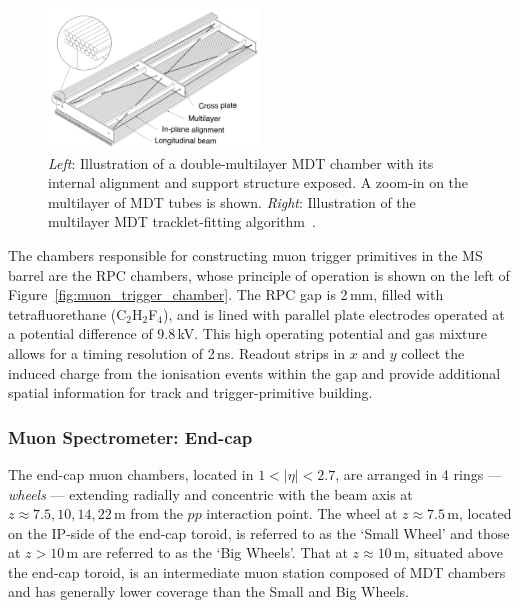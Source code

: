 \begin{figure}[!htb]
    \begin{center}
        \includegraphics[width=0.5\textwidth]{figures/chapter2/muon_spec/mdt_chamber}
        \caption{
            \textit{Left}: Illustration of a double-multilayer MDT chamber with its internal alignment
                and support structure exposed. A zoom-in on the multilayer of MDT tubes is shown.
            \textit{Right}: Illustration of the multilayer MDT tracklet-fitting algorithm~\cite{MDTtrackfit}.
        }
        \label{fig:mdt_chamber}
    \end{center}
\end{figure}

The chambers responsible for constructing muon trigger primitives in the MS barrel
are the RPC chambers, whose principle of operation is shown on the left of Figure~\ref{fig:muon_trigger_chamber}. 
The RPC gap is 2\,mm, filled with tetrafluorethane (C$_2$H$_2$F$_4$), and is lined with
parallel plate electrodes operated at a potential difference of 9.8\,kV. This high operating
potential and gas mixture allows for a timing resolution of 2\,ns. Readout strips in $x$ and $y$
collect the induced charge from the ionisation events within the gap and provide
additional spatial information for track and trigger-primitive building.

\subsubsection{Muon Spectrometer: End-cap}
\label{sec:ms_endcap}

The end-cap muon chambers, located in $1 < \lvert \eta \rvert < 2.7$, are arranged
in 4 rings --- \textit{wheels} ---  extending radially and concentric with the beam axis at $z \approx 7.5, 10, 14, 22$\,m
from the $pp$ interaction point.
The wheel at $z\approx 7.5$\,m, located on the IP-side of the end-cap toroid, is referred to as the `Small Wheel' and those at $z>10$\,m are
referred to as the `Big Wheels'.
That at $z\approx 10$\,m, situated above the end-cap toroid, is an intermediate muon station composed of MDT chambers and has generally lower coverage than the
Small and Big Wheels.

